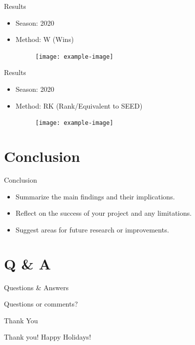 \documentclass{beamer}
\begin{document}
\begin{frame}{Results}
\begin{itemize}
  \item Season: 2020 
  \item Method: W (Wins)
  
      \begin{figure}
      \centering
      \texttt{[image: example-image]} %
    \end{figure}
    
\end{itemize}
\end{frame}

\begin{frame}{Results}
\begin{itemize}
  \item Season: 2020 
  \item Method: RK (Rank/Equivalent to SEED)
  
      \begin{figure}
      \centering
      \texttt{[image: example-image]} %
    \end{figure}
    
\end{itemize}
\end{frame}

\section{Conclusion}

\begin{frame}{Conclusion}
\begin{itemize}
  \item Summarize the main findings and their implications.
  \item Reflect on the success of your project and any limitations.
  \item Suggest areas for future research or improvements.
\end{itemize}
\end{frame}

\section{Q \& A}

\begin{frame}{Questions \& Answers}
\begin{center}
\Huge Questions or comments?
\end{center}
\end{frame}

\begin{frame}{Thank You}
\begin{center}
\Huge Thank you! Happy Holidays!
\end{center}
\end{frame}
\end{document}
